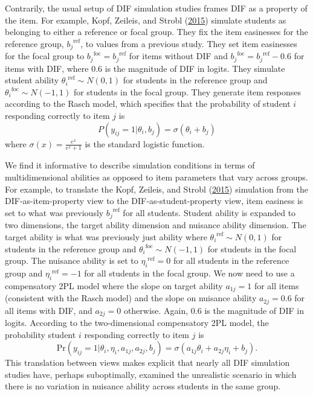 \documentclass[
  11pt,
]{article}
\begin{document}
Contrarily, the usual setup of DIF simulation studies frames DIF as a property of the item. For example, Kopf, Zeileis, and Strobl (\protect\hyperlink{ref-kopf2015framework}{2015}) simulate students as belonging to either a reference or focal group. They fix the item easinesses for the reference group, \({b_j}^{\text{ref}}\), to values from a previous study. They set item easinesses for the focal group to \({b_j}^{\text{foc}} = {b_j}^{\text{ref}}\) for items without DIF and \({b_j}^{\text{foc}} = {b_j}^{\text{ref}} - 0.6\) for items with DIF, where 0.6 is the magnitude of DIF in logits. They simulate student ability \({\theta_i}^{\text{ref}} \sim N(0,1)\) for students in the reference group and \({\theta_i}^{\text{foc}} \sim N(-1,1)\) for students in the focal group. They generate item responses according to the Rasch model, which specifies that the probability of student \(i\) responding correctly to item \(j\) is \[P(y_{ij} = 1 | \theta_i, b_j) = \sigma(\theta_i + b_j)\] where \(\sigma(x) = \frac{e^x}{e^x + 1}\) is the standard logistic function.

We find it informative to describe simulation conditions in terms of multidimensional abilities as opposed to item parameters that vary across groups. For example, to translate the Kopf, Zeileis, and Strobl (\protect\hyperlink{ref-kopf2015framework}{2015}) simulation from the DIF-as-item-property view to the DIF-as-student-property view, item easiness is set to what was previously \({b_j}^{\text{ref}}\) for all students. Student ability is expanded to two dimensions, the target ability dimension and nuisance ability dimension. The target ability is what was previously just ability where \({\theta_i}^{\text{ref}} \sim N(0,1)\) for students in the reference group and \({\theta_i}^{\text{foc}} \sim N(-1,1)\) for students in the focal group. The nuisance ability is set to \({\eta_i}^{\text{ref}} = 0\) for all students in the reference group and \({\eta_i}^{\text{ref}} = -1\) for all students in the focal group. We now need to use a compensatory 2PL model where the slope on target ability \(a_{1j} = 1\) for all items (consistent with the Rasch model) and the slope on nuisance ability \(a_{2j} = 0.6\) for all items with DIF, and \(a_{2j} = 0\) otherwise. Again, 0.6 is the magnitude of DIF in logits. According to the two-dimensional compensatory 2PL model, the probability student \(i\) responding correctly to item \(j\) is
\[
\text{Pr}(y_{ij} = 1 | \theta_i, \eta_i, a_{1j}, a_{2j}, b_j) = \sigma(a_{1j}\theta_i + a_{2j}\eta_i + b_j).
\]
This translation between views makes explicit that nearly all DIF simulation studies have, perhaps suboptimally, examined the unrealistic scenario in which there is no variation in nuisance ability across students in the same group.
\end{document}
